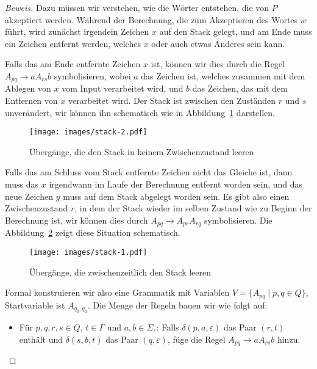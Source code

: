 \begin{proof}[Beweis]
Dazu müssen wir verstehen, wie die Wörter entstehen, die von $P$
akzeptiert werden.
Während der Berechnung, die zum Akzeptieren des
Wortes $w$ führt, wird zunächst
irgendein Zeichen $x$ auf den Stack gelegt, und am Ende muss ein
Zeichen entfernt werden, welches $x$ oder auch etwas Anderes sein kann.

Falls das am Ende entfernte Zeichen $x$ ist, können wir dies durch
die Regel $A_{pq}\to aA_{rs}b$ symbolisieren, wobei $a$ das Zeichen
ist, welches zusammen mit dem Ablegen von $x$ vom Input verarbeitet wird,
und $b$ das Zeichen, das mit dem Entfernen von $x$ verarbeitet wird.
Der Stack ist zwischen den Zuständen $r$ und $s$ unverändert, wir
können ihn schematisch wie in Abbildung~\ref{stacknichtleer} darstellen.
\begin{figure}
\begin{center}
\texttt{[image: images/stack-2.pdf]}
\end{center}
\caption{Übergänge, die den Stack in keinem Zwischenzustand leeren\label{stacknichtleer}}
\end{figure}

Falls das am Schluss vom Stack entfernte Zeichen nicht das Gleiche ist,
dann muss das $x$ irgendwann im Laufe der Berechnung entfernt worden
sein, und das neue Zeichen $y$ muss auf dem Stack abgelegt worden
sein.
Es gibt also einen Zwischenzustand $r$, in dem der Stack
wieder im selben Zustand wie zu
Beginn der Berechnung ist, wir können dies durch
$A_{pq}\to A_{pr}A_{rq}$ symbolisieren.
Die Abbildung~\ref{stackleer} zeigt diese Situation schematisch.
\begin{figure}
\begin{center}
\texttt{[image: images/stack-1.pdf]}
\end{center}
\caption{Übergänge, die zwischenzeitlich den Stack leeren\label{stackleer}}
\end{figure}

Formal konstruieren wir also eine Grammatik mit Variablen
$V=\{A_{pq}\;|\; p,q\in Q\}$, Startvariable ist $A_{q_0,q_a}$.
Die Menge der Regeln bauen wir wie folgt auf:
\begin{itemize}
\item Für $p,q,r,s\in Q$, $t\in\Gamma$ und $a,b\in\Sigma_{\varepsilon}$:
Falls $\delta(p,a,\varepsilon)$ das Paar $(r,t)$ enthält
und $\delta(s,b,t)$ das Paar $(q,\varepsilon)$, füge die Regel
$A_{pq}\to aA_{rs}b$ hinzu.


\end{itemize}
\end{proof}
